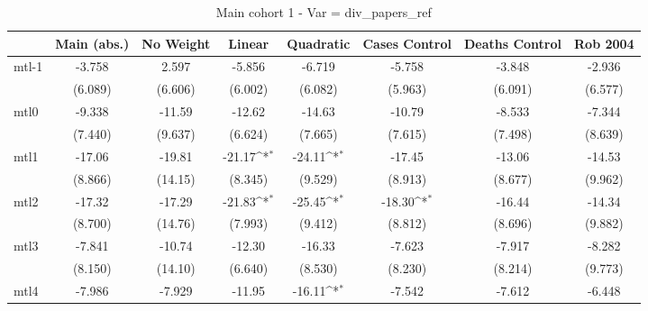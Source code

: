 \documentclass{article}
\begin{document}
{
\def\sym#1{\ifmmode^{#1}\else\(^{#1}\)\fi}
\begin{longtable}{l*{7}{c}}
\caption{Main cohort 1 - Var = div\_papers\_ref}\\
\hline\hline\endfirsthead\hline\endhead\hline\endfoot\endlastfoot
                &\multicolumn{1}{c}{Main (abs.)}&\multicolumn{1}{c}{No Weight}&\multicolumn{1}{c}{Linear}&\multicolumn{1}{c}{Quadratic}&\multicolumn{1}{c}{Cases Control}&\multicolumn{1}{c}{Deaths Control}&\multicolumn{1}{c}{Rob 2004}\\
\hline
mtl-1           &   -3.758         &    2.597         &   -5.856         &   -6.719         &   -5.758         &   -3.848         &   -2.936         \\
                &  (6.089)         &  (6.606)         &  (6.002)         &  (6.082)         &  (5.963)         &  (6.091)         &  (6.577)         \\
mtl0            &   -9.338         &   -11.59         &   -12.62         &   -14.63         &   -10.79         &   -8.533         &   -7.344         \\
                &  (7.440)         &  (9.637)         &  (6.624)         &  (7.665)         &  (7.615)         &  (7.498)         &  (8.639)         \\
mtl1            &   -17.06         &   -19.81         &   -21.17\sym{*}  &   -24.11\sym{*}  &   -17.45         &   -13.06         &   -14.53         \\
                &  (8.866)         &  (14.15)         &  (8.345)         &  (9.529)         &  (8.913)         &  (8.677)         &  (9.962)         \\
mtl2            &   -17.32         &   -17.29         &   -21.83\sym{*}  &   -25.45\sym{*}  &   -18.30\sym{*}  &   -16.44         &   -14.34         \\
                &  (8.700)         &  (14.76)         &  (7.993)         &  (9.412)         &  (8.812)         &  (8.696)         &  (9.882)         \\
mtl3            &   -7.841         &   -10.74         &   -12.30         &   -16.33         &   -7.623         &   -7.917         &   -8.282         \\
                &  (8.150)         &  (14.10)         &  (6.640)         &  (8.530)         &  (8.230)         &  (8.214)         &  (9.773)         \\
mtl4            &   -7.986         &   -7.929         &   -11.95         &   -16.11\sym{*}  &   -7.542         &   -7.612         &   -6.448         \\

\end{longtable}}
\end{document}

